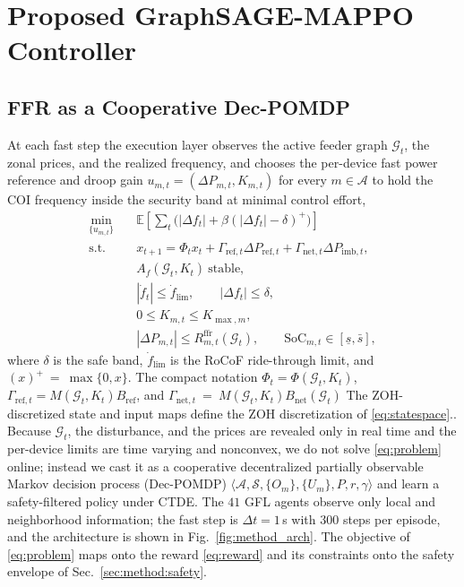 \documentclass[lettersize,journal]{IEEEtran}
\begin{document}
	
	
	\section{Proposed GraphSAGE-MAPPO Controller}
	\label{sec:method}
	\subsection{FFR as a Cooperative Dec-POMDP}
	\label{sec:method:mdp}
	
	
	At each fast step the execution layer observes the active feeder graph $\mathcal{G}_t$, the zonal prices, and the realized frequency, and chooses the per-device fast power reference and droop gain $u_{m,t}=(\Delta P_{m,t},K_{m,t})$ for every $m\in\mathcal{A}$ to hold the COI frequency inside the security band at minimal control effort,
	\begin{equation}
		\begin{aligned}
			\min_{\{u_{m,t}\}} \quad
			& \mathbb{E}\!\left[
			\sum_t \bigl(|\Delta f_t|
			+\beta(|\Delta f_t|-\delta)^+\bigr)
			\right] \\
			\mathrm{s.t.}\quad
			& x_{t+1}
			= \Phi_t x_t
			+ \Gamma_{\mathrm{ref},t}\Delta P_{\mathrm{ref},t}
			+ \Gamma_{\mathrm{net},t}\Delta P_{\mathrm{imb},t}, \\
			& A_f(\mathcal{G}_t,K_t)\ \mathrm{stable}, \\
			& |\dot f_t| \le \dot f_{\mathrm{lim}}, \qquad
			|\Delta f_t| \le \delta, \\
			& 0 \le K_{m,t} \le K_{\max,m}, \\
			& |\Delta P_{m,t}| \le R^{\mathrm{ffr}}_{m,t}(\mathcal{G}_t), \qquad
			\mathrm{SoC}_{m,t}\in[\underline{s},\bar{s}],
		\end{aligned}
		\label{eq:problem}
	\end{equation}
	where $\delta$ is the safe band, $\dot f_{\mathrm{lim}}$ is the RoCoF ride-through limit, and $(x)^+~=~\max\{0,x\}$. The compact notation $\Phi_t=\Phi(\mathcal{G}_t,K_t)$, $\Gamma_{\mathrm{ref},t}=M(\mathcal{G}_t,K_t)B_{\mathrm{ref}}$, and	
	$\Gamma_{\mathrm{net},t}~=~M(\mathcal{G}_t,K_t)B_{\mathrm{net}}(\mathcal{G}_t)$ The ZOH-discretized state and input maps define the ZOH discretization of \eqref{eq:statespace}.. Because $\mathcal{G}_t$, the disturbance, and the prices are revealed only in real time and the per-device limits are time varying and nonconvex, we do not solve \eqref{eq:problem} online; instead we cast it as a cooperative decentralized partially observable Markov decision process (Dec-POMDP) $\langle\mathcal{A},\mathcal{S},\{O_m\},\{U_m\},P,r,\gamma\rangle$ and learn a safety-filtered policy under CTDE. The $41$ GFL agents observe only local and neighborhood information; the fast step is $\Delta t=1$\,s with $300$
	steps per episode, and the architecture is shown in Fig.~\ref{fig:method_arch}. The objective of \eqref{eq:problem} maps onto the reward \eqref{eq:reward} and its constraints onto the safety envelope of Sec.~\ref{sec:method:safety}.
	
\end{document}
